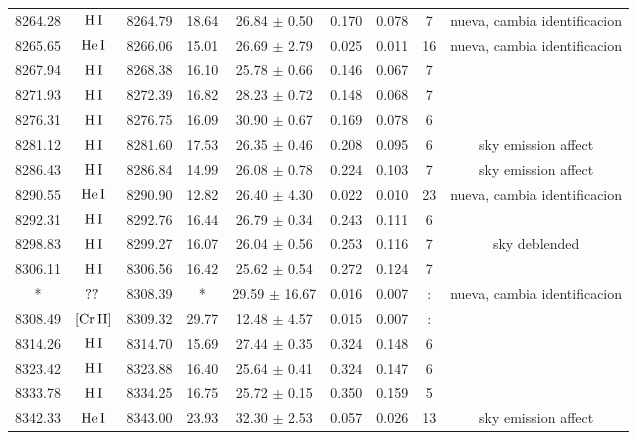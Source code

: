 \documentclass{article}
\begin{document}
\begin{table*}
\begin{adjustbox}{width=\textwidth}
\begin{tabular}{ccccccccc}
8264.28 & $\mbox{H}\thinspace \mbox{I}$ & 8264.79 & 18.64 & 26.84 $\pm$ 0.50 & 0.170 & 0.078 & 7 &  nueva, cambia identificacion \\
8265.65 & $\mbox{He}\thinspace \mbox{I}$ & 8266.06 & 15.01 & 26.69 $\pm$ 2.79 & 0.025 & 0.011 & 16 &  nueva, cambia identificacion \\
8267.94 & $\mbox{H}\thinspace \mbox{I}$ & 8268.38 & 16.10 & 25.78 $\pm$ 0.66 & 0.146 & 0.067 & 7 &  \\
8271.93 & $\mbox{H}\thinspace \mbox{I}$ & 8272.39 & 16.82 & 28.23 $\pm$ 0.72 & 0.148 & 0.068 & 7 &  \\
8276.31 & $\mbox{H}\thinspace \mbox{I}$ & 8276.75 & 16.09 & 30.90 $\pm$ 0.67 & 0.169 & 0.078 & 6 &  \\
8281.12 & $\mbox{H}\thinspace \mbox{I}$ & 8281.60 & 17.53 & 26.35 $\pm$ 0.46 & 0.208 & 0.095 & 6 &  sky emission affect \\
8286.43 & $\mbox{H}\thinspace \mbox{I}$ & 8286.84 & 14.99 & 26.08 $\pm$ 0.78 & 0.224 & 0.103 & 7 &  sky emission affect \\
8290.55 & $\mbox{He}\thinspace \mbox{I}$ & 8290.90 & 12.82 & 26.40 $\pm$ 4.30 & 0.022 & 0.010 & 23 &  nueva, cambia identificacion \\
8292.31 & $\mbox{H}\thinspace \mbox{I}$ & 8292.76 & 16.44 & 26.79 $\pm$ 0.34 & 0.243 & 0.111 & 6 &  \\
8298.83 & $\mbox{H}\thinspace \mbox{I}$ & 8299.27 & 16.07 & 26.04 $\pm$ 0.56 & 0.253 & 0.116 & 7 &  sky deblended \\
8306.11 & $\mbox{H}\thinspace \mbox{I}$ & 8306.56 & 16.42 & 25.62 $\pm$ 0.54 & 0.272 & 0.124 & 7 &  \\
* & $\mbox{??}\thinspace \mbox{}$ & 8308.39 & * & 29.59 $\pm$ 16.67 & 0.016 & 0.007 & : &  nueva, cambia identificacion \\
8308.49 & $\mbox{[Cr}\thinspace \mbox{II]}$ & 8309.32 & 29.77 & 12.48 $\pm$ 4.57 & 0.015 & 0.007 & : &  \\
8314.26 & $\mbox{H}\thinspace \mbox{I}$ & 8314.70 & 15.69 & 27.44 $\pm$ 0.35 & 0.324 & 0.148 & 6 &  \\
8323.42 & $\mbox{H}\thinspace \mbox{I}$ & 8323.88 & 16.40 & 25.64 $\pm$ 0.41 & 0.324 & 0.147 & 6 &  \\
8333.78 & $\mbox{H}\thinspace \mbox{I}$ & 8334.25 & 16.75 & 25.72 $\pm$ 0.15 & 0.350 & 0.159 & 5 &  \\
8342.33 & $\mbox{He}\thinspace \mbox{I}$ & 8343.00 & 23.93 & 32.30 $\pm$ 2.53 & 0.057 & 0.026 & 13 &  sky emission affect \\

\end{tabular}
\end{adjustbox}
\end{table*}
\end{document}
